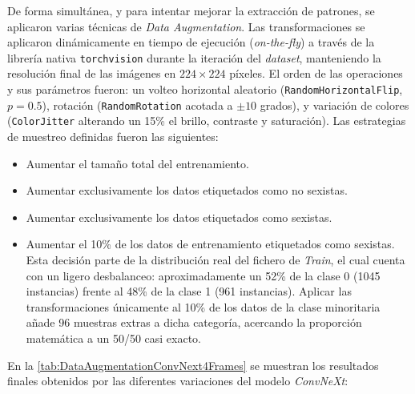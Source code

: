 De forma simultánea, y para intentar mejorar la extracción de patrones, se aplicaron varias técnicas de \textit{Data Augmentation}. Las transformaciones se aplicaron dinámicamente en tiempo de ejecución (\textit{on-the-fly}) a través de la librería nativa \texttt{torchvision} durante la iteración del \textit{dataset}, manteniendo la resolución final de las imágenes en $224 \times 224$ píxeles. El orden de las operaciones y sus parámetros fueron: un volteo horizontal aleatorio (\texttt{RandomHorizontalFlip}, $p=0.5$), rotación (\texttt{RandomRotation} acotada a $\pm10$ grados), y variación de colores (\texttt{ColorJitter} alterando un 15\% el brillo, contraste y saturación). Las estrategias de muestreo definidas fueron las siguientes: 
\begin{itemize}
    \item Aumentar el tamaño total del entrenamiento. 
    \item Aumentar exclusivamente los datos etiquetados como no sexistas.
    \item Aumentar exclusivamente los datos etiquetados como sexistas.
    \item Aumentar el 10\% de los datos de entrenamiento etiquetados como sexistas. Esta decisión parte de la distribución real del fichero de \textit{Train}, el cual cuenta con un ligero desbalanceo: aproximadamente un 52\% de la clase 0 (1045 instancias) frente al 48\% de la clase 1 (961 instancias). Aplicar las transformaciones únicamente al 10\% de los datos de la clase minoritaria añade 96 muestras extras a dicha categoría, acercando la proporción matemática a un 50/50 casi exacto. 
\end{itemize}

En la \autoref{tab:DataAugmentationConvNext4Frames} se muestran los resultados finales obtenidos por las diferentes variaciones del modelo \textit{ConvNeXt}:

